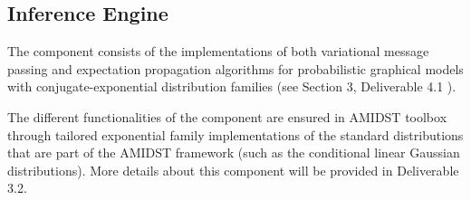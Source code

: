 \subsection{Inference Engine}

The  component consists of the implementations of both variational message passing and expectation propagation algorithms 
for probabilistic graphical models with conjugate-exponential distribution families (see Section 3, Deliverable 4.1 \cite{Deliverable4.1}). 

The different functionalities of the  component are ensured in AMIDST toolbox through tailored exponential family implementations of the standard distributions that are part of the AMIDST framework (such as the conditional linear Gaussian distributions). More details about this component will be provided in Deliverable 3.2.  